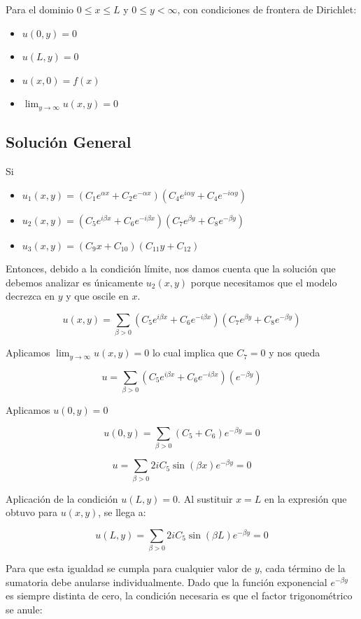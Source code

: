 \documentclass[a4paper]{article}
\begin{document}
Para el dominio $0 \le x \le L$ y $0 \le y < \infty$, con condiciones de frontera de Dirichlet:

\begin{itemize}
	\item $u(0, y) = 0$
	\item $u(L, y) = 0$
	\item $u(x, 0) = f(x)$
	\item $\lim_{y \to \infty} u(x, y) = 0$
\end{itemize}

\subsection{Solución General}

Si 

\begin{itemize}
	\item $u_1(x,y) = (C_1e^{\alpha x}+C_2e^{-\alpha x})(C_4e^{i \alpha y}+C_4 e^{-i\alpha y})$
	\item $u_2(x,y) = (C_5e^{i\beta x}+C_6e^{-i\beta x})(C_7e^{\beta y}+C_8 e^{-\beta y})$
	\item $u_3(x,y) = (C_9x+C_10)(C_11y+C_12)$ 
\end{itemize}

Entonces, debido a la condición límite, nos damos cuenta que la solución que debemos analizar es únicamente $u_2(x,y)$ porque necesitamos que el modelo decrezca en $y$ y que oscile en $x$.


$$ u(x,y) = \sum_{\beta>0}(C_5e^{i\beta x}+C_6e^{-i\beta x})(C_7e^{\beta y}+C_8 e^{-\beta y})$$

Aplicamos $\lim_{y \to \infty} u(x, y) = 0$ lo cual implica que $C_7 = 0$ y nos queda

$$ u = \sum_{\beta>0}(C_5e^{i\beta x}+C_6e^{-i\beta x})(e^{-\beta y})$$

Aplicamos $u(0, y) = 0$

$$u(0, y) =\sum_{\beta>0} (C_5+C_6) e^{-\beta y} = 0$$

$$u=\sum_{\beta>0} 2iC_5 \sin(\beta x)e^{-\beta y}= 0$$

Aplicación de la condición $u(L, y) = 0$. Al sustituir $x = L$ en la expresión que obtuvo para $u(x, y)$, se llega a:

$$u(L, y) = \sum_{\beta>0} 2i C_5 \sin(\beta L) e^{-\beta y} = 0$$

Para que esta igualdad se cumpla para cualquier valor de $y$, cada término de la sumatoria debe anularse individualmente. Dado que la función exponencial $e^{-\beta y}$ es siempre distinta de cero, la condición necesaria es que el factor trigonométrico se anule:
\end{document}
